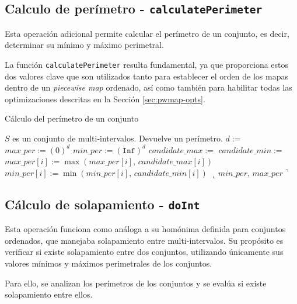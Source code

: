 \subsection{Calculo de perímetro - \texttt{calculatePerimeter}}

Esta operación adicional permite calcular el perímetro de un conjunto, es decir, determinar su mínimo y máximo perimetral.

La función \texttt{calculatePerimeter} resulta fundamental, ya que proporciona estos dos valores clave que son utilizados tanto para establecer el orden de los mapas dentro de un \textit{piecewise map} ordenado, así como también para habilitar todas las optimizaciones descritas en la Sección \ref{sec:pwmap-opts}.


\begin{algorithm}
\caption{Cálculo del perímetro de un conjunto}
\label{alg:calculatePerimeter}
\begin{algorithmic}[1]
\Require $S$ es un conjunto de multi-intervalos.
\Ensure Devuelve un perímetro.
    \State $d :=$ 
    \State $max\_per := (0)^d$ 
    \State $min\_per := (\texttt{Inf})^d$ 
        \State $candidate\_max :=$ 
        \State $candidate\_min :=$ 
            \State $max\_per[i] := \max(max\_per[i],\,candidate\_max[i])$
            \State $min\_per[i] := \min(min\_per[i],\,candidate\_min[i])$
        \EndFor
    \EndFor
    \State \Return $\llcorner\mathit{min\_per},\,\mathit{max\_per}\urcorner$ 
\EndFunction
\end{algorithmic}
\end{algorithm}

\subsection{Cálculo de solapamiento - \texttt{doInt}}

Esta operación funciona como análoga a su homónima definida para conjuntos ordenados, que manejaba solapamiento entre multi-intervalos. Su propósito es verificar si existe solapamiento entre dos conjuntos, utilizando únicamente sus valores mínimos y máximos perimetrales de los conjuntos.

Para ello, se analizan los perímetros de los conjuntos y se evalúa si existe solapamiento entre ellos.

